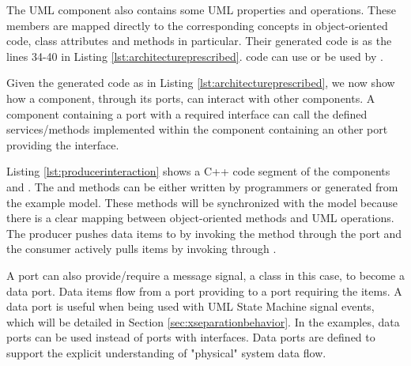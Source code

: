 \begin{minipage}{0.95\columnwidth}
	
\end{minipage}


The UML  component also contains some UML properties and operations.
These members are mapped directly to the corresponding concepts in object-oriented code, class attributes and methods in particular.
Their generated code is  as the lines 34-40 in Listing \ref{lst:architectureprescribed}.
 code can use or be used by .

\vskip 0.1cm
 Given the generated code as in Listing \ref{lst:architectureprescribed}, we now show how a component, through its ports, can interact with other components.
A component containing a port with a required interface can call the defined services/methods implemented within the component containing an other port providing the interface.

Listing \ref{lst:producerinteraction} shows a C++ code segment of the components  and .
The  and  methods can be either written by programmers or generated from the example model.
These methods will be synchronized with the model because there is a clear mapping between object-oriented methods and UML operations.
The producer pushes data items to  by invoking the  method through the  port and the consumer actively pulls items by invoking  through .

\begin{minipage}{0.95\columnwidth}
	
\end{minipage}
 
\vskip 0.1cm
A port can also provide/require a message signal, a class in this case, to become a data port.
Data items flow from a port providing to a port requiring the items.
A data port is useful when being used with UML State Machine signal events, which will be detailed in Section \ref{sec:xseparationbehavior}.
In the examples, data ports can be used instead of ports with interfaces.
Data ports are defined to support the explicit understanding of "physical" system data flow. 

